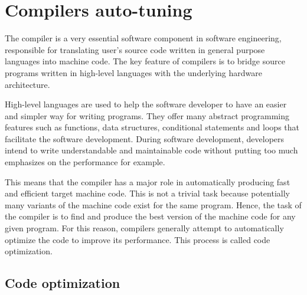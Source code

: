 \begin{itemize}
	
\end{itemize}






\section{Compilers auto-tuning}
\label{bg:Compilers auto-tuning}
The compiler is a very essential software component in software engineering, responsible for translating user's source code written in general purpose languages into machine code. The key feature of compilers is to bridge source programs written in high-level languages with the underlying hardware architecture.

High-level languages are used to help the software developer to have an easier and simpler way for writing programs. They offer many abstract programming features such as functions, data structures, conditional statements and loops that facilitate the software development.
During software development, developers intend to write understandable and maintainable code without putting too much emphasizes on the performance for example. 

This means that the compiler has a major role in automatically producing fast and efficient target machine code. This is not a trivial task because potentially many variants of the machine code exist for the same program. Hence, the task of the compiler is to find and produce the best version of the machine code for any given program. For this reason, compilers generally attempt to automatically optimize the code to improve its performance.
This process is called code optimization. 

\subsection{Code optimization}

